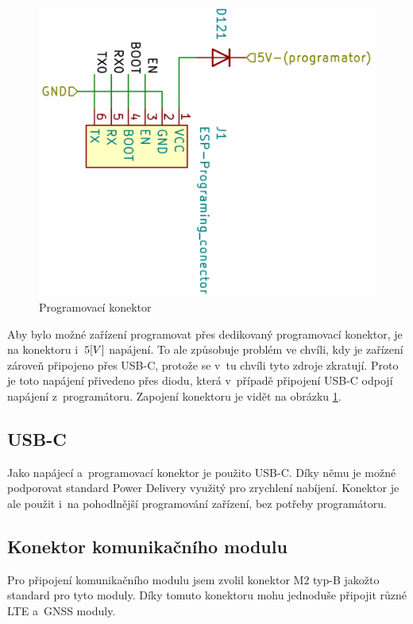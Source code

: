 \begin{figure}[h]
    \vspace{-3mm}
    \centering
    \includegraphics[width=\textwidth]{text/TeoretickyUvod/AplikaceHernichZarizeni/img/programator.png}
    \caption{Programovací konektor}
    \label{fig:programator}
\end{figure}
Aby bylo možné zařízení programovat přes dedikovaný programovací konektor, je na konektoru i~\(5\-[V]\) napájení.
To ale způsobuje problém ve chvíli, kdy je zařízení zároveň připojeno přes USB-C, protože se v~tu chvíli tyto zdroje zkratují.
Proto je toto napájení přivedeno přes diodu, která v~případě připojení USB-C odpojí napájení z~programátoru.
Zapojení konektoru je vidět na obrázku \ref{fig:programator}.

\subsection{USB-C}
Jako napájecí a~programovací konektor je použito USB-C.
Díky němu je možné podporovat standard Power Delivery využitý pro zrychlení nabíjení.
Konektor je ale použit i~na pohodlnější programování zařízení, bez potřeby programátoru.

\subsection{Konektor komunikačního modulu}
Pro připojení komunikačního modulu jsem zvolil konektor M2 typ-B jakožto standard pro tyto moduly.
Díky tomuto konektoru mohu jednoduše připojit různé LTE a~GNSS moduly.